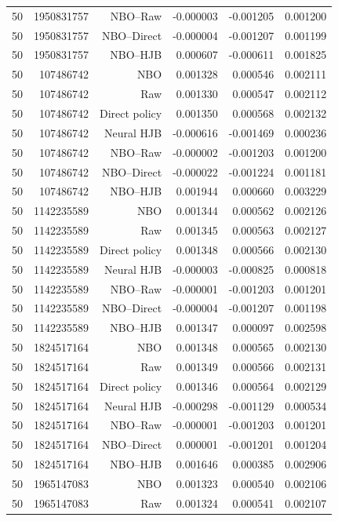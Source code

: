 \begin{longtable}{lrrrrr}
50 & 1950831757 & NBO--Raw & -0.000003 & -0.001205 & 0.001200 \\
50 & 1950831757 & NBO--Direct & -0.000004 & -0.001207 & 0.001199 \\
50 & 1950831757 & NBO--HJB & 0.000607 & -0.000611 & 0.001825 \\
50 & 107486742 & NBO & 0.001328 & 0.000546 & 0.002111 \\
50 & 107486742 & Raw & 0.001330 & 0.000547 & 0.002112 \\
50 & 107486742 & Direct policy & 0.001350 & 0.000568 & 0.002132 \\
50 & 107486742 & Neural HJB & -0.000616 & -0.001469 & 0.000236 \\
50 & 107486742 & NBO--Raw & -0.000002 & -0.001203 & 0.001200 \\
50 & 107486742 & NBO--Direct & -0.000022 & -0.001224 & 0.001181 \\
50 & 107486742 & NBO--HJB & 0.001944 & 0.000660 & 0.003229 \\
50 & 1142235589 & NBO & 0.001344 & 0.000562 & 0.002126 \\
50 & 1142235589 & Raw & 0.001345 & 0.000563 & 0.002127 \\
50 & 1142235589 & Direct policy & 0.001348 & 0.000566 & 0.002130 \\
50 & 1142235589 & Neural HJB & -0.000003 & -0.000825 & 0.000818 \\
50 & 1142235589 & NBO--Raw & -0.000001 & -0.001203 & 0.001201 \\
50 & 1142235589 & NBO--Direct & -0.000004 & -0.001207 & 0.001198 \\
50 & 1142235589 & NBO--HJB & 0.001347 & 0.000097 & 0.002598 \\
50 & 1824517164 & NBO & 0.001348 & 0.000565 & 0.002130 \\
50 & 1824517164 & Raw & 0.001349 & 0.000566 & 0.002131 \\
50 & 1824517164 & Direct policy & 0.001346 & 0.000564 & 0.002129 \\
50 & 1824517164 & Neural HJB & -0.000298 & -0.001129 & 0.000534 \\
50 & 1824517164 & NBO--Raw & -0.000001 & -0.001203 & 0.001201 \\
50 & 1824517164 & NBO--Direct & 0.000001 & -0.001201 & 0.001204 \\
50 & 1824517164 & NBO--HJB & 0.001646 & 0.000385 & 0.002906 \\
50 & 1965147083 & NBO & 0.001323 & 0.000540 & 0.002106 \\
50 & 1965147083 & Raw & 0.001324 & 0.000541 & 0.002107 \\

\end{longtable}
